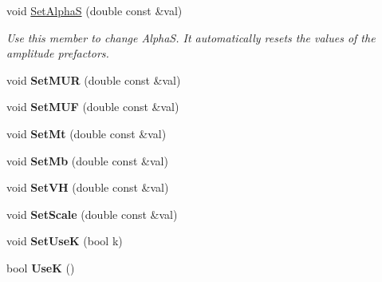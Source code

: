 \begin{DoxyCompactItemize}
\item 
\hypertarget{classHiggsModel_a5a3f7171856b2106141948544fc49f13}{}void \hyperlink{classHiggsModel_a5a3f7171856b2106141948544fc49f13}{Set\+Alpha\+S} (double const \&val)\label{classHiggsModel_a5a3f7171856b2106141948544fc49f13}

\begin{DoxyCompactList}\small\item\em Use this member to change Alpha\+S. It automatically resets the values of the amplitude prefactors. \end{DoxyCompactList}\item 
\hypertarget{classHiggsModel_a40b498b2555458a9abc4ea989e72ce91}{}void {\bfseries Set\+M\+U\+R} (double const \&val)\label{classHiggsModel_a40b498b2555458a9abc4ea989e72ce91}

\item 
\hypertarget{classHiggsModel_a8e8772814f7441352b226eb0566a263e}{}void {\bfseries Set\+M\+U\+F} (double const \&val)\label{classHiggsModel_a8e8772814f7441352b226eb0566a263e}

\item 
\hypertarget{classHiggsModel_a511bd13bf20268e59567b2049d7a5781}{}void {\bfseries Set\+Mt} (double const \&val)\label{classHiggsModel_a511bd13bf20268e59567b2049d7a5781}

\item 
\hypertarget{classHiggsModel_a460c285dbbd117c30be6ea43f5271e2d}{}void {\bfseries Set\+Mb} (double const \&val)\label{classHiggsModel_a460c285dbbd117c30be6ea43f5271e2d}

\item 
\hypertarget{classHiggsModel_a058daf0cc3b8cad4077419d19d8e4c21}{}void {\bfseries Set\+V\+H} (double const \&val)\label{classHiggsModel_a058daf0cc3b8cad4077419d19d8e4c21}

\item 
\hypertarget{classHiggsModel_aaca4ad2dcfd40c87e76fc88ab95b56dc}{}void {\bfseries Set\+Scale} (double const \&val)\label{classHiggsModel_aaca4ad2dcfd40c87e76fc88ab95b56dc}

\item 
\hypertarget{classHiggsModel_a0f932c9eddbc1d0f93b97135c2db468d}{}void {\bfseries Set\+Use\+K} (bool k)\label{classHiggsModel_a0f932c9eddbc1d0f93b97135c2db468d}

\item 
\hypertarget{classHiggsModel_acd450a454977065794aa76695963c8eb}{}bool {\bfseries Use\+K} ()\label{classHiggsModel_acd450a454977065794aa76695963c8eb}


\end{DoxyCompactItemize}
